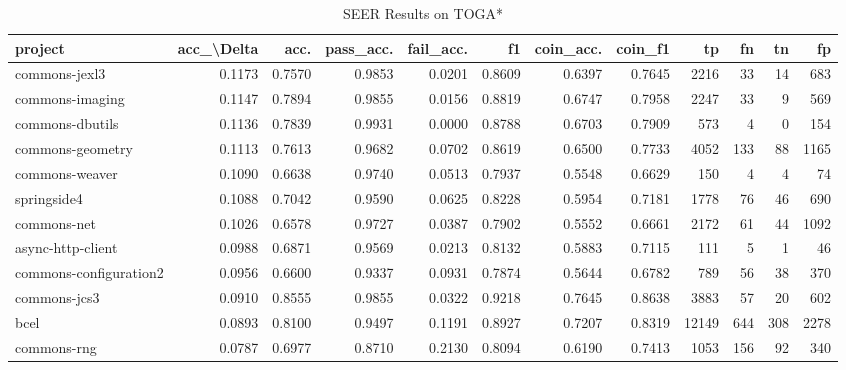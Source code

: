 \begin{table}
\centering
\caption{SEER Results on TOGA*}
\label{tab:toga_results_all}
\begin{tabular}{lrrrrrrrrrrr}
\toprule
                project &  acc\_\textbackslash Delta &    acc. &  pass\_acc. &  fail\_acc. &      f1 &  coin\_acc. &  coin\_f1 &      tp &    fn &    tn &     fp \\
\midrule
          commons-jexl3 &      0.1173 &  0.7570 &     0.9853 &     0.0201 &  0.8609 &     0.6397 &   0.7645 &    2216 &    33 &    14 &    683 \\
        commons-imaging &      0.1147 &  0.7894 &     0.9855 &     0.0156 &  0.8819 &     0.6747 &   0.7958 &    2247 &    33 &     9 &    569 \\
        commons-dbutils &      0.1136 &  0.7839 &     0.9931 &     0.0000 &  0.8788 &     0.6703 &   0.7909 &     573 &     4 &     0 &    154 \\
       commons-geometry &      0.1113 &  0.7613 &     0.9682 &     0.0702 &  0.8619 &     0.6500 &   0.7733 &    4052 &   133 &    88 &   1165 \\
         commons-weaver &      0.1090 &  0.6638 &     0.9740 &     0.0513 &  0.7937 &     0.5548 &   0.6629 &     150 &     4 &     4 &     74 \\
            springside4 &      0.1088 &  0.7042 &     0.9590 &     0.0625 &  0.8228 &     0.5954 &   0.7181 &    1778 &    76 &    46 &    690 \\
            commons-net &      0.1026 &  0.6578 &     0.9727 &     0.0387 &  0.7902 &     0.5552 &   0.6661 &    2172 &    61 &    44 &   1092 \\
      async-http-client &      0.0988 &  0.6871 &     0.9569 &     0.0213 &  0.8132 &     0.5883 &   0.7115 &     111 &     5 &     1 &     46 \\
 commons-configuration2 &      0.0956 &  0.6600 &     0.9337 &     0.0931 &  0.7874 &     0.5644 &   0.6782 &     789 &    56 &    38 &    370 \\
           commons-jcs3 &      0.0910 &  0.8555 &     0.9855 &     0.0322 &  0.9218 &     0.7645 &   0.8638 &    3883 &    57 &    20 &    602 \\
                   bcel &      0.0893 &  0.8100 &     0.9497 &     0.1191 &  0.8927 &     0.7207 &   0.8319 &   12149 &   644 &   308 &   2278 \\
            commons-rng &      0.0787 &  0.6977 &     0.8710 &     0.2130 &  0.8094 &     0.6190 &   0.7413 &    1053 &   156 &    92 &    340 \\

\end{tabular}
\end{table}
